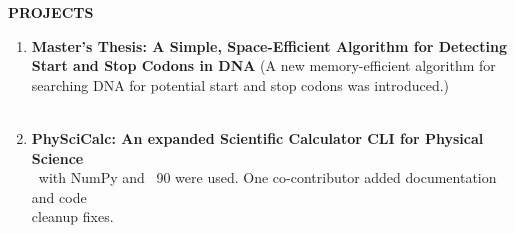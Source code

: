 \textbf{\headingcolor PROJECTS}\\
\begin{enumerate}[topsep=0pt]
\item{\textbf{Master's Thesis: A Simple, Space-Efficient Algorithm for Detecting Start and Stop Codons in DNA} 
(A new memory-efficient algorithm for searching DNA for potential start and stop codons was introduced.)}\\
\ \\ 
\item \textbf{PhySciCalc: An expanded Scientific Calculator CLI for Physical Science}\\ 
\Py \ with 
NumPy and \FOR \ 90 were used. One co-contributor added documentation and code\\ 
cleanup fixes.\\
\end{enumerate}